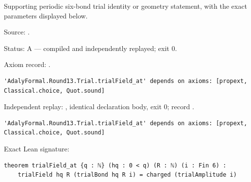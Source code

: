 \begin{theorem}[bp-358]
\label{bp-358}
\leanok
Supporting periodic six-bond trial identity or geometry statement, with the exact parameters displayed below.

\par Source: \texttt{}.
\par Status: A — compiled and independently replayed; exit 0.
\par Axiom record: \texttt{}.
\begin{verbatim}
'AdalyFormal.Round13.Trial.trialField_at' depends on axioms: [propext, Classical.choice, Quot.sound]
\end{verbatim}
\par Independent replay: \texttt{}, identical declaration body, exit 0; record \texttt{}.
\begin{verbatim}
'AdalyFormal.Round13.Trial.trialField_at' depends on axioms: [propext, Classical.choice, Quot.sound]
\end{verbatim}
\par Exact Lean signature:
\begin{verbatim}
theorem trialField_at {q : ℕ} (hq : 0 < q) (R : ℕ) (i : Fin 6) :
    trialField hq R (trialBond hq R i) = charged (trialAmplitude i)
\end{verbatim}
\end{theorem}

